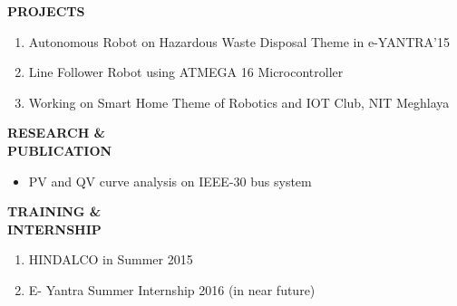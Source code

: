 \documentclass{article}
\begin{document}
\begin{flushleft} 
	\vspace{0.3in}
	\textbf{PROJECTS}
	\begin{enumerate}
		\vspace{-0.29in}
		\addtolength{\itemindent}{1.359in}
		\item  Autonomous Robot on Hazardous Waste Disposal Theme in e-YANTRA'15
		\item  Line Follower Robot using ATMEGA 16 Microcontroller
		\item Working on Smart Home Theme of Robotics and IOT Club, NIT
		Meghlaya
	\end{enumerate}
\end{flushleft}

  \begin{flushleft} 
  	\vspace{0.3in}
  	\textbf{RESEARCH \& \\ PUBLICATION}
  	\begin{itemize}
  		\vspace{-0.44in}
  		\addtolength{\itemindent}{1.359in}
  		\item  PV and QV curve analysis on IEEE-30 bus system
  	\end{itemize}
  \end{flushleft}


\begin{flushleft} 
	\vspace{0.3in}
	\textbf{TRAINING \& \\ INTERNSHIP}
	\begin{enumerate}
		\vspace{-0.44in}
		\addtolength{\itemindent}{1.359in}
		\item  HINDALCO in Summer 2015
		\item  E- Yantra Summer Internship 2016 (in near future)
	\end{enumerate}
\end{flushleft}
\end{document}
